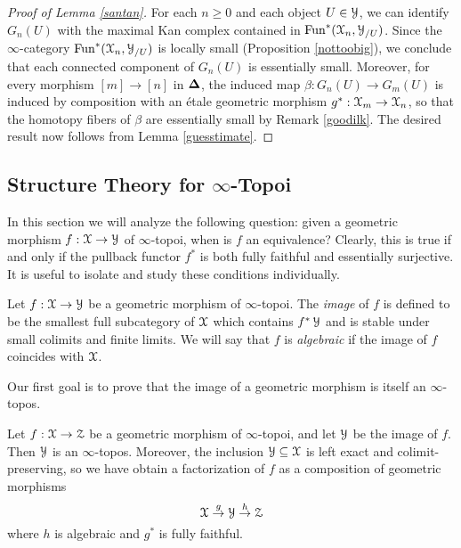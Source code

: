 \begin{proof}[Proof of Lemma \ref{santan}]
For each $n \geq 0$ and each object $U \in \operatorname{\mathcal{Y}}$, we can identify $G_{n}(U)$ with the
maximal Kan complex contained in $\operatorname{Fun}^{\ast}( \operatorname{\mathcal{X}}_{n}, \operatorname{\mathcal{Y}}_{/U})$. Since the $\infty$-category $\operatorname{Fun}^{\ast}( \operatorname{\mathcal{X}}_{n}, \operatorname{\mathcal{Y}}_{/U})$ is locally small (Proposition \ref{nottoobig}), we conclude that each connected component of $G_{n}(U)$ is essentially small.
Moreover, for every morphism $[m] \rightarrow [n]$ in $\operatorname{{\bf \Delta}}$, the induced map
$\beta: G_{n}(U) \rightarrow G_{m}(U)$ is induced by composition with an \'{e}tale geometric morphism
$g^{\ast}: \operatorname{\mathcal{X}}_{m} \rightarrow \operatorname{\mathcal{X}}_{n}$, so that the homotopy fibers of $\beta$ are essentially
small by Remark \ref{goodilk}. The desired result now follows from Lemma \ref{guesstimate}.
\end{proof}


\subsection{Structure Theory for $\infty$-Topoi}\label{structuretheor}

In this section we will analyze the following question: given a geometric morphism
$f: \operatorname{\mathcal{X}} \rightarrow \operatorname{\mathcal{Y}}$ of $\infty$-topoi, when is $f$ an equivalence? Clearly, this is true if and only if the pullback functor $f^{\ast}$ is both fully faithful and essentially surjective. It is useful to isolate and study these conditions individually.

\begin{definition}\label{nutro}
Let $f: \operatorname{\mathcal{X}} \rightarrow \operatorname{\mathcal{Y}}$ be a geometric morphism of $\infty$-topoi. The
{\it image} of $f$ is defined to be the smallest full subcategory of $\operatorname{\mathcal{X}}$ which contains
$f^{\ast} \operatorname{\mathcal{Y}}$ and is stable under small colimits and finite limits. 
We will say that $f$ is {\it algebraic} if the image of $f$ coincides with $\operatorname{\mathcal{X}}$.
\end{definition}

Our first goal is to prove that the image of a geometric morphism is itself an $\infty$-topos.

\begin{proposition}\label{proet}
Let $f: \operatorname{\mathcal{X}} \rightarrow \operatorname{\mathcal{Z}}$ be a geometric morphism of $\infty$-topoi, and let $\operatorname{\mathcal{Y}}$
be the image of $f$. Then $\operatorname{\mathcal{Y}}$ is an $\infty$-topos. Moreover, the inclusion
$\operatorname{\mathcal{Y}} \subseteq \operatorname{\mathcal{X}}$ is left exact and colimit-preserving, so we have obtain a factorization of $f$ as a composition of geometric morphisms
$$ \operatorname{\mathcal{X}} \stackrel{g}{\rightarrow} \operatorname{\mathcal{Y}} \stackrel{h}{\rightarrow} \operatorname{\mathcal{Z}}$$
where $h$ is algebraic and $g^{\ast}$ is fully faithful. 
\end{proposition}


